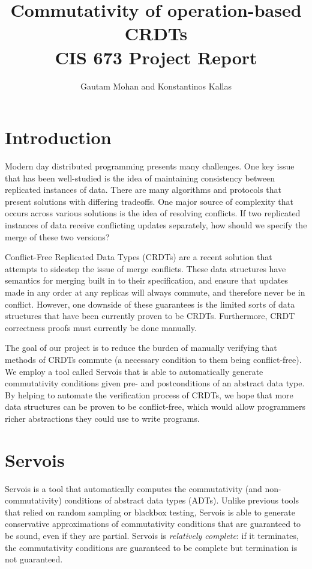 \documentclass{article}
\begin{document}
\title{Commutativity of operation-based CRDTs \\ CIS 673 Project Report}
\author{Gautam Mohan and Konstantinos Kallas}


\maketitle

\section{Introduction}

Modern day distributed programming presents many challenges. One
key issue that has been well-studied is the idea of maintaining consistency
between replicated instances of data. There are many algorithms and
protocols that present solutions with differing tradeoffs. One major
source of complexity that occurs across various solutions is the idea of
resolving conflicts. If two replicated instances of data receive conflicting
updates separately, how should we specify the merge of these two versions?

Conflict-Free Replicated Data Types (CRDTs) are a recent solution that attempts
to sidestep the issue of merge conflicts. These data structures have semantics
for merging built in to their specification, and ensure that updates made in any
order at any replicas will always commute, and therefore never be in conflict.
However, one downside of these guarantees is the limited sorts of data
structures that have been currently proven to be CRDTs. Furthermore, CRDT
correctness proofs must currently be done manually.

The goal of our project is to reduce the burden of manually verifying that
methods of CRDTs commute (a necessary condition to them being conflict-free). We
employ a tool called Servois that is able to automatically generate
commutativity conditions given pre- and postconditions of an abstract data type.
By helping to automate the verification process of CRDTs, we hope that more data
structures can be proven to be conflict-free, which would allow programmers
richer abstractions they could use to write programs.

\section{Servois}

Servois \cite{bansal2018servois} is a tool that automatically computes the
commutativity (and non-commutativity) conditions of abstract data types (ADTs). Unlike
previous tools that relied on random sampling or blackbox testing, Servois is
able to generate conservative approximations of commutativity conditions that
are guaranteed to be sound, even if they are partial. Servois is
\textit{relatively complete}: if it terminates, the commutativity conditions are
guaranteed to be complete but termination is not guaranteed.
\end{document}
